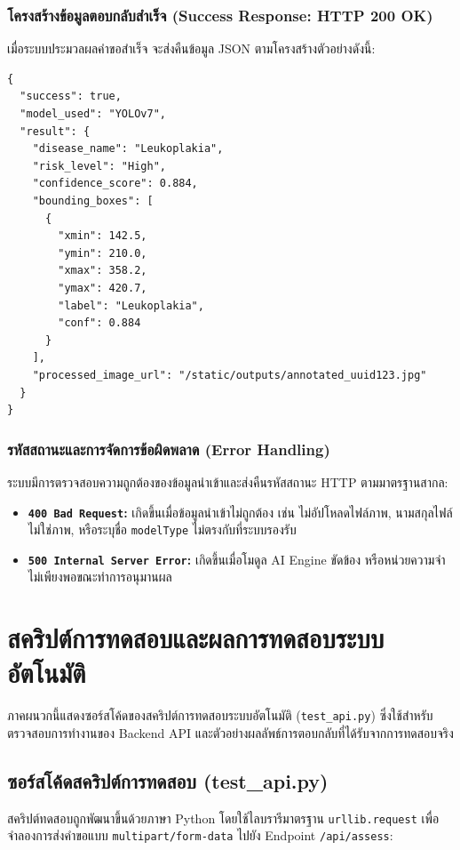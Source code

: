 \subsection{โครงสร้างข้อมูลตอบกลับสำเร็จ (Success Response: HTTP 200 OK)}
เมื่อระบบประมวลผลคำขอสำเร็จ จะส่งคืนข้อมูล JSON ตามโครงสร้างตัวอย่างดังนี้:

\begin{verbatim}
{
  "success": true,
  "model_used": "YOLOv7",
  "result": {
    "disease_name": "Leukoplakia",
    "risk_level": "High",
    "confidence_score": 0.884,
    "bounding_boxes": [
      {
        "xmin": 142.5,
        "ymin": 210.0,
        "xmax": 358.2,
        "ymax": 420.7,
        "label": "Leukoplakia",
        "conf": 0.884
      }
    ],
    "processed_image_url": "/static/outputs/annotated_uuid123.jpg"
  }
}
\end{verbatim}

\subsection{รหัสสถานะและการจัดการข้อผิดพลาด (Error Handling)}
ระบบมีการตรวจสอบความถูกต้องของข้อมูลนำเข้าและส่งคืนรหัสสถานะ HTTP ตามมาตรฐานสากล:
\begin{itemize}
    \item \textbf{\texttt{400 Bad Request}:} เกิดขึ้นเมื่อข้อมูลนำเข้าไม่ถูกต้อง เช่น ไม่อัปโหลดไฟล์ภาพ, นามสกุลไฟล์ไม่ใช่ภาพ, หรือระบุชื่อ \texttt{modelType} ไม่ตรงกับที่ระบบรองรับ
    \item \textbf{\texttt{500 Internal Server Error}:} เกิดขึ้นเมื่อโมดูล AI Engine ขัดข้อง หรือหน่วยความจำไม่เพียงพอขณะทำการอนุมานผล
\end{itemize}

\chapter{สคริปต์การทดสอบและผลการทดสอบระบบอัตโนมัติ}
\label{appendix:test_scripts}

ภาคผนวกนี้แสดงซอร์สโค้ดของสคริปต์การทดสอบระบบอัตโนมัติ (\texttt{test\_api.py}) ซึ่งใช้สำหรับตรวจสอบการทำงานของ Backend API และตัวอย่างผลลัพธ์การตอบกลับที่ได้รับจากการทดสอบจริง

\section{ซอร์สโค้ดสคริปต์การทดสอบ (test\_api.py)}
สคริปต์ทดสอบถูกพัฒนาขึ้นด้วยภาษา Python โดยใช้ไลบรารีมาตรฐาน \texttt{urllib.request} เพื่อจำลองการส่งคำขอแบบ \texttt{multipart/form-data} ไปยัง Endpoint \texttt{/api/assess}:

